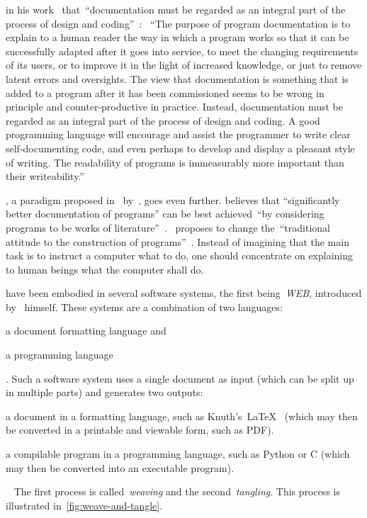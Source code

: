 \documentclass[%
    a4paper,    %
    justified,  %
    nobib,      %
    openany     %
]{tufte-book}
\begin{document}
 in his
work~ that~\enquote{documentation must be regarded as
an integral part of the process of design and coding}~\cite[p.
195]{hoare-hpl-1973}: ~\enquote{The purpose of program documentation is to
explain to a human reader the way in which a program works so that it can be
successfully adapted after it goes into service, to meet the changing
requirements of its users, or to improve it in the light of increased knowledge,
or just to remove latent errors and oversights. The view that documentation is
something that is added to a program after it has been commissioned seems to be
wrong in principle and counter-productive in practice. Instead, documentation
must be regarded as an integral part of the process of design and coding. A good
programming language will encourage and assist the programmer to write clear
self-documenting code, and even perhaps to develop and display a pleasant style
of writing. The readability of programs is immeasurably more important than
their writeability.}~\cite[p. 195]{hoare-hpl-1973}

, a paradigm proposed
in~\citeyear{knuth-lp-1984} by~\citeauthor{knuth-lp-1984}, goes even further.
\citeauthor{knuth-lp-1984} believes that \enquote{significantly better
documentation of programs} can be best achieved~\enquote{by considering programs
to be works of literature}~\cite[p.
1]{knuth-lp-1984}.~\citeauthor{knuth-lp-1984} proposes to change
the~\enquote{traditional attitude to the construction of programs}~\cite[p.
1]{knuth-lp-1984}. Instead of imagining that the main task is to instruct a
computer what to do, one should concentrate on explaining to human beings what
the computer shall do.~\cite[p. 1]{knuth-lp-1984}

 have been embodied in several
software systems, the first being~\emph{WEB}, introduced
by~\citeauthor{knuth-lp-1984} himself. These systems are a combination of two
languages:
\begin{enumerate*}
  \item a document formatting language and
  \item a programming language
\end{enumerate*}.
Such a software system uses a single document as input (which can be split up in
multiple parts) and generates two outputs:
\begin{enumerate*}
  \item a document in a formatting language, such as
    Knuth's~\LaTeX{}~\cite{knuth-tex-1987} (which may then be converted in a
    printable and viewable form, such as PDF).
  \item a compilable program in a programming language, such as Python or C
    (which may then be converted into an executable program).
\end{enumerate*}~\cite{knuth-lp-1984}
The first process is called~\emph{weaving} and the second~\emph{tangling}. This
process is illustrated in~\autoref{fig:weave-and-tangle}.
\end{document}
